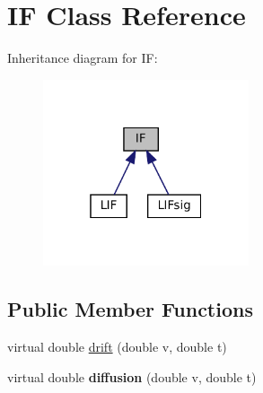 \hypertarget{classIF}{}\section{IF Class Reference}
\label{classIF}


Inheritance diagram for IF\+:
\nopagebreak
\begin{figure}[H]
\begin{center}
\leavevmode
\includegraphics[width=172pt]{classIF__inherit__graph}
\end{center}
\end{figure}
\subsection*{Public Member Functions}
\begin{DoxyCompactItemize}
\item 
virtual double \mbox{\hyperlink{classIF_a9bbd53df68cb9028bf87cf5273253e91}{drift}} (double v, double t)
\item 
\mbox{\label{classIF_a45c14ff90b19a93769c2c30741cd482d}} 
virtual double {\bfseries diffusion} (double v, double t)
\end{DoxyCompactItemize}
